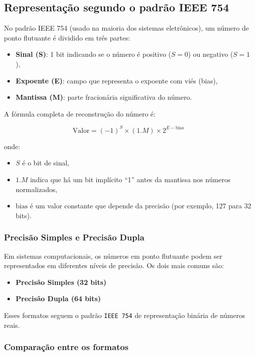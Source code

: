 \subsection{Representação segundo o padrão IEEE 754}

No padrão IEEE 754 (usado na maioria dos sistemas eletrônicos), um número de
ponto flutuante é dividido em três partes:

\begin{itemize}
  \item \textbf{Sinal (S)}: 1 bit indicando se o número é positivo (\( S = 0 \)) ou negativo (\( S = 1 \)),
  \item \textbf{Expoente (E)}: campo que representa o expoente com viés (bias),
  \item \textbf{Mantissa (M)}: parte fracionária significativa do número.
\end{itemize}

A fórmula completa de reconstrução do número é:

\[
  \text{Valor} = (-1)^S \times (1.M) \times 2^{E - \text{bias}}
\]

onde:

\begin{itemize}
  \item \( S \) é o bit de sinal,
  \item \( 1.M \) indica que há um bit implícito ``1'' antes da mantissa nos números normalizados,
  \item \( \text{bias} \) é um valor constante que depende da precisão (por exemplo, 127 para 32 bits).
\end{itemize}

\subsubsection{Precisão Simples e Precisão Dupla}

Em sistemas computacionais, os números em ponto flutuante podem ser
representados em diferentes níveis de precisão. Os dois mais comuns são:

\begin{itemize}
  \item \textbf{Precisão Simples (32 bits)}
  \item \textbf{Precisão Dupla (64 bits)}
\end{itemize}

Esses formatos seguem o padrão \texttt{IEEE 754} de representação binária de
números reais.

\subsubsection{Comparação entre os formatos}

